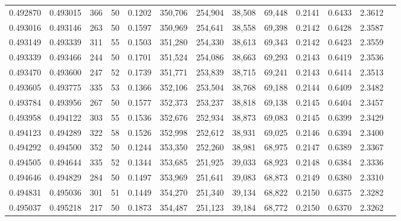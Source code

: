\begin{tabular}{rrrrrrrrrrrrr}
0.492870 & 0.493015 &   366 &  50 &                                     0.1202 & 350,706 & 254,904 &  38,508 &  69,448 & 0.2141 & 0.6433 & 2.3612 \\
0.493016 & 0.493146 &   263 &  50 &                                     0.1597 & 350,969 & 254,641 &  38,558 &  69,398 & 0.2142 & 0.6428 & 2.3587 \\
0.493149 & 0.493339 &   311 &  55 &                                     0.1503 & 351,280 & 254,330 &  38,613 &  69,343 & 0.2142 & 0.6423 & 2.3559 \\
0.493339 & 0.493466 &   244 &  50 &                                     0.1701 & 351,524 & 254,086 &  38,663 &  69,293 & 0.2143 & 0.6419 & 2.3536 \\
0.493470 & 0.493600 &   247 &  52 &                                     0.1739 & 351,771 & 253,839 &  38,715 &  69,241 & 0.2143 & 0.6414 & 2.3513 \\
0.493605 & 0.493775 &   335 &  53 &                                     0.1366 & 352,106 & 253,504 &  38,768 &  69,188 & 0.2144 & 0.6409 & 2.3482 \\
0.493784 & 0.493956 &   267 &  50 &                                     0.1577 & 352,373 & 253,237 &  38,818 &  69,138 & 0.2145 & 0.6404 & 2.3457 \\
0.493958 & 0.494122 &   303 &  55 &                                     0.1536 & 352,676 & 252,934 &  38,873 &  69,083 & 0.2145 & 0.6399 & 2.3429 \\
0.494123 & 0.494289 &   322 &  58 &                                     0.1526 & 352,998 & 252,612 &  38,931 &  69,025 & 0.2146 & 0.6394 & 2.3400 \\
0.494292 & 0.494500 &   352 &  50 &                                     0.1244 & 353,350 & 252,260 &  38,981 &  68,975 & 0.2147 & 0.6389 & 2.3367 \\
0.494505 & 0.494644 &   335 &  52 &                                     0.1344 & 353,685 & 251,925 &  39,033 &  68,923 & 0.2148 & 0.6384 & 2.3336 \\
0.494646 & 0.494829 &   284 &  50 &                                     0.1497 & 353,969 & 251,641 &  39,083 &  68,873 & 0.2149 & 0.6380 & 2.3310 \\
0.494831 & 0.495036 &   301 &  51 &                                     0.1449 & 354,270 & 251,340 &  39,134 &  68,822 & 0.2150 & 0.6375 & 2.3282 \\
0.495037 & 0.495218 &   217 &  50 &                                     0.1873 & 354,487 & 251,123 &  39,184 &  68,772 & 0.2150 & 0.6370 & 2.3262 \\

\end{tabular}
